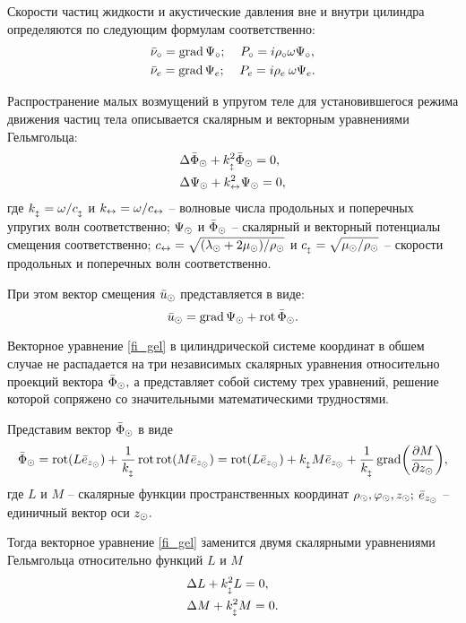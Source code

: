 Скорости частиц жидкости и акустические давления вне и внутри цилиндра определяются по следующим формулам соответственно:
\begin{align*}
&\bar{\nu}_\circ=\operatorname{grad}\Psi_\circ;\:\:\:\:\:P_\circ=i\rho_\circ\omega\Psi_\circ,\\
&\bar{\nu}_e=\operatorname{grad}\Psi_e;\:\:\:\:\:P_e=i\rho_e\:\omega\Psi_e.
\end{align*}

Распространение малых возмущений в упругом теле для установившегося режима движения частиц тела описывается скалярным и векторным уравнениями Гельмгольца:
\begin{align}
&\Delta\bar{\Phi}_\odot+k_{_\updownarrow}^2\bar{\Phi}_\odot=0,\\
&\Delta\Psi_\odot+k_\leftrightarrow^2\Psi_\odot=0,\label{fi_gel}
\end{align}
где $k_{_\updownarrow}=\omega/c_{_\updownarrow}$ и $k_\leftrightarrow=\omega/c_\leftrightarrow$ -- волновые числа продольных и поперечных упругих волн соответственно; $\Psi_\odot$ и $\bar{\Phi}_\odot$ -- скалярный и векторный потенциалы смещения соответственно; $c_\leftrightarrow=\sqrt{(\lambda_\odot+2\mu_\odot)/\rho_\odot}$ и $c_{_\updownarrow}=\sqrt{\mu_\odot/\rho_\odot}$ -- скорости продольных и поперечных волн соответственно.

При этом вектор смещения $\bar{u}_\odot$ представляется в виде:
\begin{equation}
\bar{u}_\odot=\operatorname{grad}\Psi_\odot+\operatorname{rot}\bar{\Phi}_\odot.
\end{equation}

Векторное уравнение \eqref{fi_gel} в цилиндрической системе координат в обшем случае не распадается на три независимых скалярных уравнения относительно проекций вектора $\bar{\Phi}_\odot,$ а представляет собой систему трех уравнений, решение которой сопряжено со значительными математическими трудностями.

Представим вектор $\bar{\Phi}_\odot$ в виде
$$\bar{\Phi}_\odot=\operatorname{rot}(L\bar{e}_{z_\odot})+\frac1{k_{_\updownarrow}}\operatorname{rot}\operatorname{rot}(M\bar{e}_{z_\odot})=\operatorname{rot}(L\bar{e}_{z_\odot})+k_{_\updownarrow} M\bar{e}_{z_\odot}+\frac1{k_{_\updownarrow}}\operatorname{grad}\biggl(\frac{\partial M}{\partial z_\odot}\biggr),$$
где $L$ и $M$ -- скалярные функции пространственных координат $\rho_\odot, \varphi_\odot, z_\odot;$
\newline
$\bar{e}_{z_\odot}$ -- единичный вектор оси $z_\odot.$

Тогда векторное уравнение \eqref{fi_gel} заменится двумя скалярными уравнениями Гельмгольца относительно функций $L$ и $M$
\begin{align*}
&\Delta L+k_{_\updownarrow}^2L=0,\\
&\Delta M+k_{_\updownarrow}^2M=0.
\end{align*}

